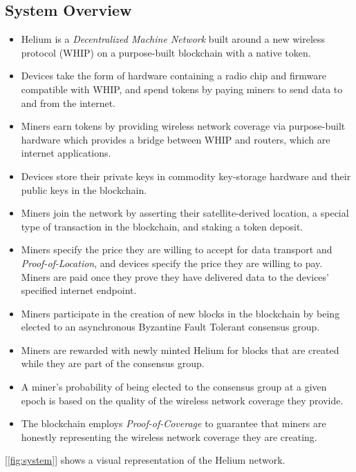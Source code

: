 \documentclass[UTF8, 10pt, nonatbib, nocopyrightspace, reprint]{sigplanconf}
\newcommand{\figref}[1]{[\autoref{#1}]}
\begin{document}
\subsection{System Overview}

\begin{itemize}
    \item Helium is a \emph{Decentralized Machine Network} built around a new wireless protocol (WHIP) on a purpose-built blockchain with a native token.
    \item Devices take the form of hardware containing a radio chip and firmware compatible with WHIP, and spend tokens by paying miners to send data to and from the internet.
    \item Miners earn tokens by providing wireless network coverage via purpose-built hardware which provides a bridge between WHIP and routers, which are internet applications.
    \item Devices store their private keys in commodity key-storage hardware and their public keys in the blockchain.
    \item Miners join the network by asserting their satellite-derived location, a special type of transaction in the blockchain, and staking a token deposit.
    \item Miners specify the price they are willing to accept for data transport and \emph{Proof-of-Location}, and devices specify the price they are willing to pay. Miners are paid once they prove they have delivered data to the devices' specified internet endpoint.
    \item Miners participate in the creation of new blocks in the blockchain by being elected to an asynchronous Byzantine Fault Tolerant consensus group.
    \item Miners are rewarded with newly minted Helium for blocks that are created while they are part of the consensus group. 
    \item A miner's probability of being elected to the consensus group at a given epoch is based on the quality of the wireless network coverage they provide.
    \item The blockchain employs \emph{Proof-of-Coverage} to guarantee that miners are honestly representing the wireless network coverage they are creating.
\end{itemize}

\figref{fig:system} shows a visual representation of the Helium network.
\end{document}
